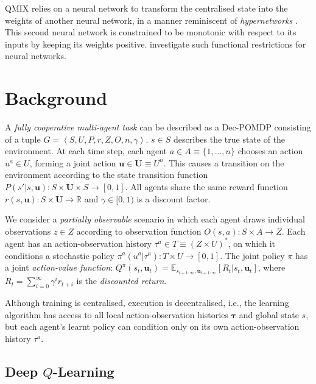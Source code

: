 \documentclass{article}
\begin{document}
QMIX relies on a neural network to transform the centralised state into the 
weights of another neural network, in a manner reminiscent of 
\emph{hypernetworks} \citep{ha_hypernetworks_2016}. This second neural network 
is constrained to be monotonic with respect to its inputs by keeping its 
weights positive. \citet{Dugas_2009} investigate such functional restrictions 
for neural networks.






 \section{Background}
\label{sec:background}


A \textit{fully cooperative multi-agent task} can be described as a Dec-POMDP \cite{oliehoek_concise_2016} consisting of a tuple $G=\left\langle S,U,P,r,Z,O,n,\gamma\right\rangle$. 
$s \in S$ describes the true state of the environment.
At each time step, each agent $a \in A \equiv \{1,...,n\}$ chooses an action $u^a\in U$, forming a joint action $\mathbf{u}\in\mathbf{U}\equiv U^n$. 
This causes a transition on the environment according to the state transition function $P(s'|s,\mathbf{u}):S\times\mathbf{U}\times S\rightarrow [0,1]$. 
All agents share the same reward function $r(s,\mathbf{u}):S\times\mathbf{U}\rightarrow\mathbb{R}$ and $\gamma\in[0,1)$ is a discount factor. 

We consider a \textit{partially observable} scenario in which each agent draws individual observations $z\in Z$ according to observation function $O(s,a):S\times A\rightarrow Z$. 
Each agent has an action-observation history $\tau^a\in T\equiv(Z\times U)^*$, on which it conditions a stochastic policy $\pi^a(u^a|\tau^a):T\times U\rightarrow [0,1]$. The joint policy $\pi$ has a joint \textit{action-value function}: $Q^\pi(s_t, \mathbf{u}_t)=\mathbb{E}_{s_{t+1:\infty},\mathbf{u}_{t+1:\infty}} \left[R_t|s_t,\mathbf{u}_t\right]$, where $R_t=\sum^{\infty}_{i=0}\gamma^ir_{t+i}$ is the \textit{discounted return}.


Although training is centralised, execution is decentralised, i.e., the 
learning algorithm has access to all local action-observation histories 
$\boldsymbol{\tau}$ and global state $s$, but each agent's learnt policy can 
condition only on its own action-observation history $\tau^a$.

\subsection{Deep $Q$-Learning}
\end{document}
